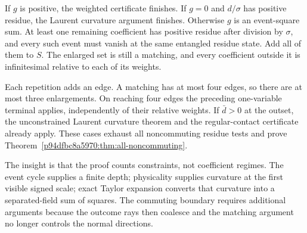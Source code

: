 If $g$ is positive, the weighted certificate finishes.  If $g=0$ and
$d/\sigma$ has positive residue, the Laurent curvature argument finishes.
Otherwise $g$ is an event-square sum.  At least one remaining coefficient
has positive residue after division by $\sigma$, and every such event must
vanish at the same entangled residue state.  Add all of them to $S$.
The enlarged set is still a matching, and every coefficient outside it is
infinitesimal relative to each of its weights.

Each repetition adds an edge.  A matching has at most four edges, so there
are at most three enlargements.  On reaching four edges the preceding
one-variable terminal applies, independently of their relative weights.
If $\bar d>0$ at the outset, the unconstrained Laurent curvature theorem
and the regular-contact certificate already apply.  These cases exhaust
all noncommuting residue tests and prove Theorem~\ref{p94dfbc8a5970:thm:all-noncommuting}.

The insight is that the proof counts constraints, not coefficient regimes.
The event cycle supplies a finite depth; physicality supplies curvature at
the first visible signed scale; exact Taylor expansion converts that
curvature into a separated-field sum of squares.  The commuting boundary
requires additional arguments because the outcome rays then coalesce and
the matching argument no longer controls the normal directions.
